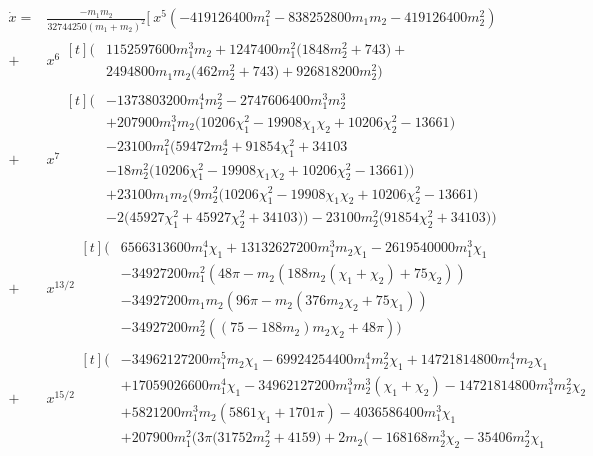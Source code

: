 \documentclass[twocolumn,prd,aps,superscriptaddress,preprintnumbers,tightenlines,showpacs,nofootinbib,eqsecnum,amsfonts,amsmath]{revtex4}
\begin{document}
\begin{widetext}
\begin{align}\label{eq:xdot}
\dot{x} = &\frac{-m_1 m_2}{32744250 (m_1 + m_2)^2} \bigg[ \:x^5 \left( -419126400 m_1^2-838252800 m_1 m_2-419126400 m_2^2\right) 
\\\nonumber
+& x^6 
\begin{aligned}[t]
	\big( & 1152597600 m_1^3 m_2+1247400 m_1^2 \big(1848 			m_2^2+743\big)+ \\ \nonumber
 	&2494800 m_1 m_2 \big(462 m_2^2+743\big)+926818200 m_2^2\big)
 \end{aligned}
\\\nonumber
+& x^7 
\begin{aligned}[t]
\big(&-1373803200 m_1^4 m_2^2-2747606400 m_1^3 m_2^3 
\\ &+207900 m_1^3 m_2 \big(10206 \chi_1^2-19908 \chi_1 \chi_2+10206 \chi_2^2-13661\big) 
   \\ &-23100 m_1^2 \big(59472 m_2^4 +91854 \chi_1^2+34103
   \\&-18 m_2^2 \big(10206 \chi_1^2-19908 \chi_1 \chi_2+10206 \chi_2^2-13661\big)\big) 
   \\&+23100 m_1 m_2 \big(9 m_2^2 \big(10206 \chi_1^2-19908 \chi_1 \chi_2+10206 \chi_2^2-13661\big)
   \\&-2 \big(45927 \chi_1^2+45927 \chi_2^2+34103\big)\big)
  -23100 m_2^2 \big(91854 \chi_2^2+34103\big)\big)
\end{aligned}
\\
+&x^{13/2} 
\begin{aligned}[t]
	\big(&6566313600 m_1^4 \chi_1+13132627200 m_1^3 m_2 \chi_1-2619540000 m_1^3 \chi_1
	\\&-34927200 m_1^2 (48 \pi -m_2 (188 m_2
   (\chi_1+\chi_2)+75 \chi_2))
   \\&-34927200 m_1 m_2 (96 \pi -m_2 (376 m_2 \chi_2+75 \chi_1))
   \\&-34927200 m_2^2 ((75-188 m_2) m_2
   \chi_2+48 \pi )\big)
\end{aligned}
\\
+& x^{15/2}
\begin{aligned}[t]
	 \big(&-34962127200 m_1^5 m_2 \chi_1-69924254400 m_1^4 m_2^2 \chi_1+14721814800 m_1^4 m_2 \chi_1
	 \\&+17059026600 m_1^4 \chi_1-34962127200 m_1^3 m_2^3 (\chi_1+\chi_2)-14721814800 m_1^3 m_2^2 \chi_2
   \\&+5821200 m_1^3 m_2 (5861 \chi_1+1701 \pi )-4036586400
   m_1^3 \chi_1
   \\&+207900 m_1^2 \big(3 \pi  \big(31752 m_2^2+4159\big)+2 m_2 \big(-168168 m_2^3 \chi_2-35406 m_2^2 \chi_1

\end{aligned}
\end{align}
\end{widetext}
\end{document}
